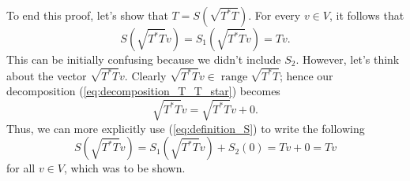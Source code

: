 \documentclass{article}
\begin{document}
To end this proof, let's show that $T=S(\sqrt{T^*T})$. For every $v\in V$, it follows that
\[S(\sqrt{T^*T}v)=S_1(\sqrt{T^*T}v)=Tv.\]
This can be initially confusing because we didn't include $S_2$. However, let's think about the vector $\sqrt{T^*T}v$. Clearly $\sqrt{T^*T}v\in\operatorname{range}\sqrt{T^*T}$; hence our decomposition (\ref{eq:decomposition_T_T_star}) becomes
\[\sqrt{T^*T}v=\sqrt{T^*T}v+0.\]
Thus, we can more explicitly use (\ref{eq:definition_S}) to write the following
\[S(\sqrt{T^*T}v)=S_1(\sqrt{T^*T}v)+S_2(0)=Tv+0=Tv\]
for all $v\in V$, which was to be shown.
\end{document}
